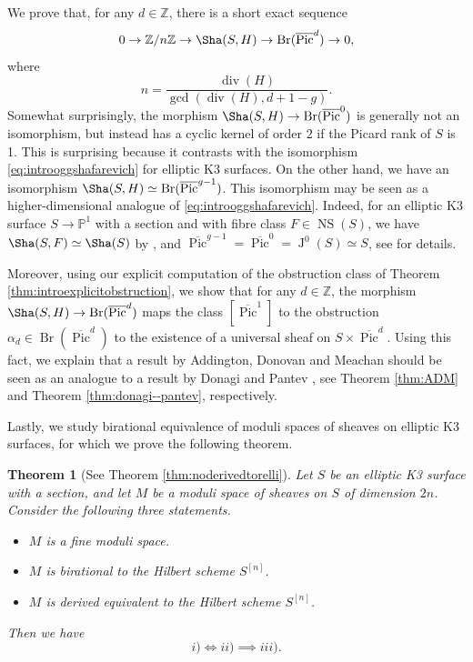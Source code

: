 \documentclass[11pt,twoside]{amsart}
\numberwithin{equation}{section}
\newtheorem{theorem}[dummy]{Theorem}
\theoremstyle{definition}
\theoremstyle{plain}
\newcommand{\Z}{\ensuremath{\mathbb{Z}}}
\newcommand{\PP}{\ensuremath{\mathbb{P}}}
\def\NS{\operatorname{NS}}
\def\olPic{\overline{\operatorname{Pic}}}
\def\Br{\operatorname{Br}}
\def\Jac{\operatorname{J}}
\def\dv{\operatorname{div}}
\begin{document}
We prove that, for any $d\in \Z$, there is a short exact sequence $$0\to \Z/n\Z\to \Sha(S,H)\to \Br(\olPic^d)\to 0,$$ where $$n = \frac{\dv(H)}{\gcd(\dv(H),d+1-g)}.$$ Somewhat surprisingly, the morphism $\Sha(S,H)\to \Br(\olPic^0)$ is generally not an isomorphism, but instead has a cyclic kernel of order $2$ if the Picard rank of $S$ is 1. This is surprising because it contrasts with the isomorphism \eqref{eq:introoggshafarevich} for elliptic K3 surfaces. On the other hand, we have an isomorphism $\Sha(S,H)\simeq \Br(\olPic^{g-1})$. This isomorphism may be seen as a higher-dimensional analogue of \eqref{eq:introoggshafarevich}. 
Indeed, for an elliptic K3 surface $S\to \PP^1$ with a section and with fibre class $F\in \NS(S)$, we have $\Sha(S,F)\simeq \Sha(S)$ by \cite[\S5.1]{HM23}, and $\olPic^{g-1} = \olPic^0 = \Jac^0(S)\simeq S$,  see \cite[\S11.4]{Huy16} for details. 

Moreover, using our explicit computation of the obstruction class of Theorem \ref{thm:introexplicitobstruction}, we show that for any $d\in \Z$, the morphism $\Sha(S,H)\to \Br(\olPic^d)$ maps the class $[\olPic^1]$ to the obstruction $\alpha_d\in \Br(\olPic^d)$ to the existence of a universal sheaf on $S\times \olPic^d$. Using this fact, we explain that a result by Addington, Donovan and Meachan \cite{ADM16} should be seen as an analogue to a result by Donagi and Pantev \cite{DP08}, see Theorem \ref{thm:ADM} and Theorem \ref{thm:donagi--pantev}, respectively.


Lastly, we study birational equivalence of moduli spaces of sheaves on elliptic K3 surfaces, for which we prove the following theorem.

\begin{theorem}[See Theorem \ref{thm:noderivedtorelli}] \label{thm:intronoderivedtorelli}
    Let $S$ be an elliptic K3 surface with a section, and let $M$ be a moduli space of sheaves on $S$ of dimension $2n$. Consider the following three statements.
    \begin{itemize}
        \item[i)] $M$ is a fine moduli space.
        \item[ii)] $M$ is birational to the Hilbert scheme $S^{[n]}$.
        \item[iii)] $M$ is derived equivalent to the Hilbert scheme $S^{[n]}$.
    \end{itemize}
    Then we have $$i) \iff ii) \implies iii).$$ 
\end{theorem}
\end{document}
